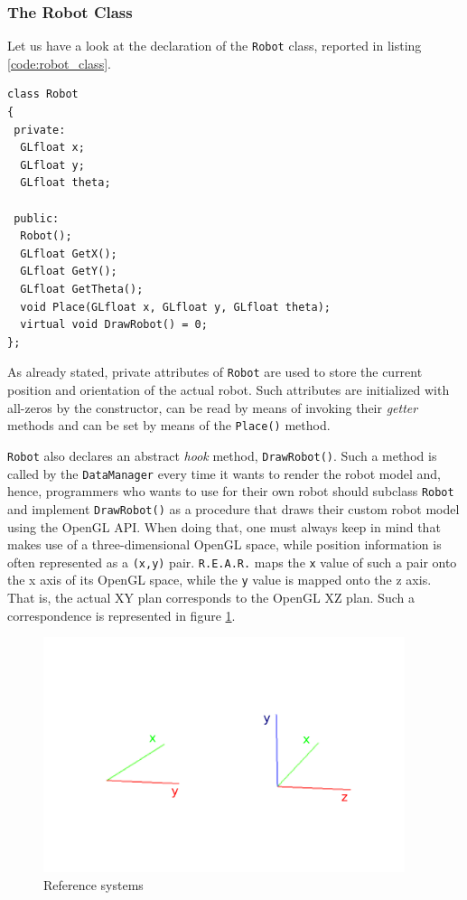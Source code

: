 \subsubsection{The Robot Class}
\label{sub:robotclass}
Let us have a look at the declaration of the \texttt{Robot}
class, reported in listing \ref{code:robot_class}.
%
\begin{lstlisting}[caption={\texttt{Robot} class declaration}, label={code:robot_class}, frame=trBL]
class Robot
{
 private:
  GLfloat x;
  GLfloat y;					
  GLfloat theta;

 public:
  Robot();
  GLfloat GetX();
  GLfloat GetY();
  GLfloat GetTheta();
  void Place(GLfloat x, GLfloat y, GLfloat theta);
  virtual void DrawRobot() = 0;
};
\end{lstlisting}
%
As already stated, private attributes of \texttt{Robot} 
are used to store the current position and orientation 
of the actual robot. Such attributes are initialized with 
all-zeros by the constructor, can be read by means 
of invoking their \textit{getter} methods and can be set 
by means of the \texttt{Place()} method.
%

%
\texttt{Robot} also declares an abstract \textit{hook} method, 
\texttt{DrawRobot()}. Such a method is called by the 
\texttt{DataManager} every time it wants to render the 
robot model and, hence, programmers who wants to 
use \framework{} for their own robot should subclass 
\texttt{Robot} and implement \texttt{DrawRobot()} as a 
procedure that draws their custom robot model using 
the OpenGL API.
%
When doing that, one must always keep in mind that 
\framework{} makes use of a three-dimensional OpenGL 
space, while position information is often represented 
as a \texttt{(x,y)} pair. \texttt{R.E.A.R.} maps the \texttt{x} 
value of such a pair onto the x axis of its OpenGL space, 
while the \texttt{y} value is mapped onto the z axis.
%
That is, the actual XY plan corresponds to the OpenGL 
XZ plan. Such a correspondence is represented in figure 
\ref{fig:reference_systems}.
%
\begin{figure}[!h]
  \begin{center}
    \includegraphics[width=300pt]{img/reference_system.png}
    \caption{Reference systems}
    \label{fig:reference_systems}
  \end{center}
\end{figure}
%

